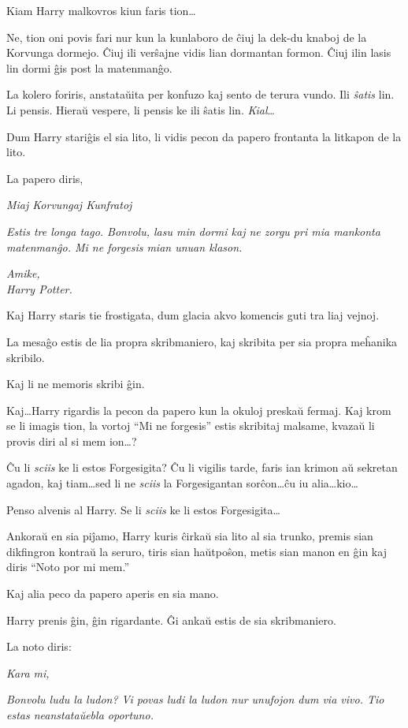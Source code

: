 Kiam Harry malkovros kiun faris tion\ldots

Ne, tion oni povis fari nur kun la kunlaboro de ĉiuj la dek-du knaboj
de la Korvunga dormejo. Ĉiuj ili verŝajne vidis lian dormantan
formon. Ĉiuj ilin lasis lin dormi ĝis post la matenmanĝo.

La kolero foriris, anstataŭita per konfuzo kaj sento de terura vundo.
Ili \emph{ŝatis} lin. Li pensis. Hieraŭ vespere, li pensis ke ili
ŝatis lin. \emph{Kial}\ldots

Dum Harry stariĝis el sia lito, li vidis pecon da papero frontanta la
litkapon de la lito.

La papero diris,
\medskip

\emph{Miaj Korvungaj Kunfratoj}

\emph{Estis tre longa tago. Bonvolu, lasu min dormi kaj ne zorgu pri
  mia mankonta matenmanĝo. Mi ne forgesis mian unuan klason.}

\emph{Amike,\\
  Harry Potter.
}
\medskip

Kaj Harry staris tie frostigata, dum glacia akvo komencis guti tra
liaj vejnoj.

La mesaĝo estis de lia propra skribmaniero, kaj skribita per sia
propra meĥanika skribilo.

Kaj li ne memoris skribi ĝin.

Kaj\ldots Harry rigardis la pecon da papero kun la okuloj preskaŭ fermaj. Kaj
krom se li imagis tion, la vortoj ``Mi ne forgesis'' estis skribitaj malsame,
kvazaŭ li provis diri al si mem ion\ldots?

Ĉu li \emph{sciis} ke li estos Forgesigita? Ĉu li vigilis tarde, faris
ian krimon aŭ sekretan agadon, kaj tiam\ldots sed li ne \emph{sciis}
la Forgesigantan sorĉon\ldots ĉu iu alia\ldots kio\ldots

Penso alvenis al Harry. Se li \emph{sciis} ke li estos
Forgesigita\ldots

Ankoraŭ en sia piĵamo, Harry kuris ĉirkaŭ sia lito al sia trunko,
premis sian dikfingron kontraŭ la seruro, tiris sian haŭtpoŝon, metis
sian manon en ĝin kaj diris ``Noto por mi mem.''

Kaj alia peco da papero aperis en sia mano.

Harry prenis ĝin, ĝin rigardante. Ĝi ankaŭ estis de sia skribmaniero.

La noto diris:
\medskip

\emph{Kara mi,}

\emph{Bonvolu ludu la ludon? Vi povas ludi la ludon nur unufojon dum
  via vivo. Tio estas neanstataŭebla oportuno.}

